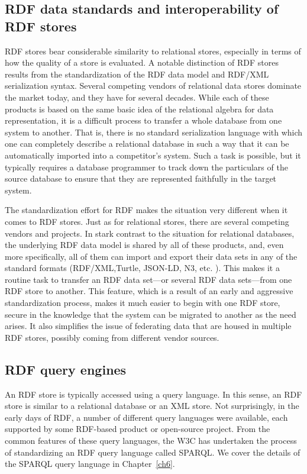 \subsection{RDF data standards and interoperability of RDF stores}

RDF stores bear considerable similarity to relational stores, especially
in terms of how the quality of a store is evaluated. A notable
distinction of RDF stores results from the standardization of the RDF
data model and RDF/XML serialization syntax. Several competing vendors
of relational data stores dominate the market today, and they have for
several decades. While each of these products is based on the same basic
idea of the relational algebra for data representation, it is a
difficult process to transfer a whole database from one system to
another. That is, there is no standard serialization language with which
one can completely describe a relational database in such a way that it
can be automatically imported into a competitor's system. Such a task is
possible, but it typically requires a database programmer to track down
the particulars of the source database to ensure that they are
represented faithfully in the target system.

The standardization effort for RDF makes the situation very different
when it comes to RDF stores. Just as for relational stores, there are
several competing vendors and projects. In stark contrast to the
situation for relational databases, the underlying RDF data model is
shared by all of these products, and, even more specifically, all of
them can import and export their data sets in any of the standard
formats (RDF/XML,Turtle, JSON-LD, N3, etc. ). This makes it a routine
task to transfer an RDF data set---or several RDF data sets---from one
RDF store to another. This feature, which is a result of an early and
aggressive standardization process, makes it much easier to begin with
one RDF store, secure in the knowledge that the system can be migrated
to another as the need arises. It also simplifies the issue of
federating data that are housed in multiple RDF stores, possibly coming
from different vendor sources.

\subsection{RDF query engines}

An RDF store is typically accessed using a query language. In this
sense, an RDF store is similar to a relational database or an XML store.
Not surprisingly, in the early days of RDF, a number of different query
languages were available, each supported by some RDF-based product or
open-source project. From the common features of these query languages,
the W3C has undertaken the process of standardizing an RDF query
language called SPARQL. We cover the details of the SPARQL query
language in Chapter~\ref{ch6}.

